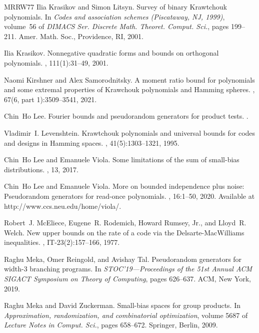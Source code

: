 \documentclass[10pt,a4paper]{article}
\theoremstyle{definition}
\begin{document}
\begin{thebibliography}{MRRW77}
Ilia Krasikov and Simon Litsyn.
\newblock Survey of binary {K}rawtchouk polynomials.
\newblock In {\em Codes and association schemes ({P}iscataway, {NJ}, 1999)}, volume~56 of {\em DIMACS Ser. Discrete Math. Theoret. Comput. Sci.}, pages 199--211. Amer. Math. Soc., Providence, RI, 2001.

Ilia Krasikov.
\newblock Nonnegative quadratic forms and bounds on orthogonal polynomials.
, 111(1):31--49, 2001.

Naomi Kirshner and Alex Samorodnitsky.
\newblock A moment ratio bound for polynomials and some extremal properties of {K}rawchouk polynomials and {H}amming spheres.
, 67(6, part 1):3509--3541, 2021.

Chin~Ho Lee.
\newblock Fourier bounds and pseudorandom generators for product tests.
.

Vladimir~I. Levenshtein.
\newblock Krawtchouk polynomials and universal bounds for codes and designs in {H}amming spaces.
, 41(5):1303--1321, 1995.

Chin~Ho Lee and Emanuele Viola.
\newblock Some limitations of the sum of small-bias distributions.
, 13, 2017.

Chin~Ho Lee and Emanuele Viola.
\newblock More on bounded independence plus noise: Pseudorandom generators for read-once polynomials.
, 16:1--50, 2020.
\newblock Available at http://www.ccs.neu.edu/home/viola/.

Robert~J. McEliece, Eugene~R. Rodemich, Howard Rumsey, Jr., and Lloyd~R. Welch.
\newblock New upper bounds on the rate of a code via the {D}elsarte-{M}ac{W}illiams inequalities.
, IT-23(2):157--166, 1977.

Raghu Meka, Omer Reingold, and Avishay Tal.
\newblock Pseudorandom generators for width-3 branching programs.
\newblock In {\em S{TOC}'19---{P}roceedings of the 51st {A}nnual {ACM} {SIGACT} {S}ymposium on {T}heory of {C}omputing}, pages 626--637. ACM, New York, 2019.

Raghu Meka and David Zuckerman.
\newblock Small-bias spaces for group products.
\newblock In {\em Approximation, randomization, and combinatorial optimization}, volume 5687 of {\em Lecture Notes in Comput. Sci.}, pages 658--672. Springer, Berlin, 2009.


\end{thebibliography}
\end{document}
